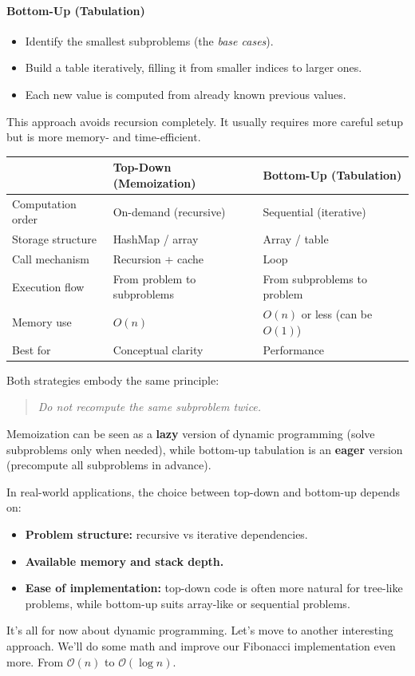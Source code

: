 \documentclass{article}
\begin{document}
\paragraph{Bottom-Up (Tabulation)}
\begin{itemize}
	\item Identify the smallest subproblems (the \emph{base cases}).
	\item Build a table iteratively, filling it from smaller indices to larger ones.
	\item Each new value is computed from already known previous values.
\end{itemize}
This approach avoids recursion completely.
It usually requires more careful setup but is more memory- and time-efficient.

\begin{center}
	\begin{tabular}{lll}
		\toprule
		& \textbf{Top-Down (Memoization)} & \textbf{Bottom-Up (Tabulation)} \\
		\midrule
		Computation order & On-demand (recursive) & Sequential (iterative) \\
		Storage structure & HashMap / array & Array / table \\
		Call mechanism & Recursion + cache & Loop \\
		Execution flow & From problem to subproblems & From subproblems to problem \\
		Memory use & $O(n)$ & $O(n)$ or less (can be $O(1)$) \\
		Best for & Conceptual clarity & Performance \\
		\bottomrule
	\end{tabular}
\end{center}

Both strategies embody the same principle:
\begin{quote}
	\emph{Do not recompute the same subproblem twice.}
\end{quote}

Memoization can be seen as a \textbf{lazy} version of dynamic programming
(solve subproblems only when needed),
while bottom-up tabulation is an \textbf{eager} version
(precompute all subproblems in advance).

In real-world applications, the choice between top-down and bottom-up depends on:
\begin{itemize}
	\item \textbf{Problem structure:} recursive vs iterative dependencies.
	\item \textbf{Available memory and stack depth.}
	\item \textbf{Ease of implementation:} top-down code is often more natural for tree-like problems,
	while bottom-up suits array-like or sequential problems.
\end{itemize}
It's all for now about dynamic programming. Let's move to another interesting approach. We'll do some math and improve our Fibonacci implementation even more.
From $\mathcal{O}(n)$ to $\mathcal{O}(\log n)$.
\end{document}
